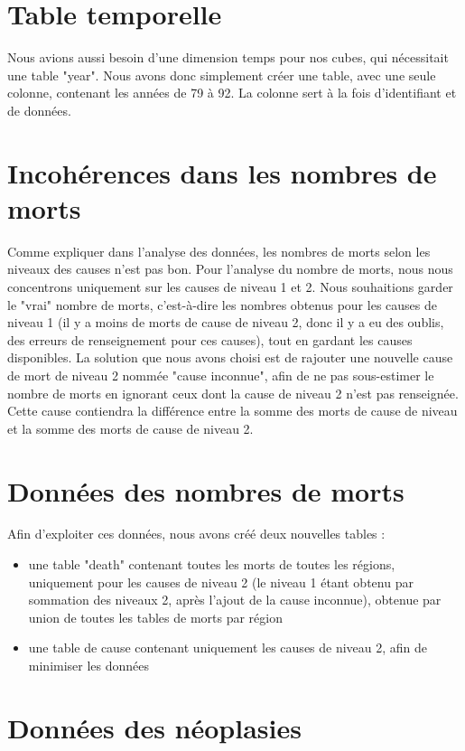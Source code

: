 \section{Table temporelle}

    Nous avions aussi besoin d'une dimension temps pour nos cubes, qui nécessitait une table "year". Nous avons donc simplement créer une table, avec une seule colonne, contenant les années de 79 à 92. La colonne sert à la fois d'identifiant et de données.


\section{Incohérences dans les nombres de morts}

    Comme expliquer dans l'analyse des données, les nombres de morts selon les niveaux des causes n'est pas bon. Pour l'analyse du nombre de morts, nous nous concentrons uniquement sur les causes de niveau 1 et 2. Nous souhaitions garder le "vrai" nombre de morts, c'est-à-dire les nombres obtenus pour les causes de niveau 1 (il y a moins de morts de cause de niveau 2, donc il y a eu des oublis, des erreurs de renseignement pour ces causes), tout en gardant les causes disponibles. La solution que nous avons choisi est de rajouter une nouvelle cause de mort de niveau 2 nommée "cause inconnue", afin de ne pas sous-estimer le nombre de morts en ignorant ceux dont la cause de niveau 2 n'est pas renseignée. Cette cause contiendra la différence entre la somme des morts de cause de niveau et la somme des morts de cause de niveau 2.

\section{Données des nombres de morts}

    Afin d'exploiter ces données, nous avons créé deux nouvelles tables :
    \begin{itemize}
        \item{une table "death" contenant toutes les morts de toutes les régions, uniquement pour les causes de niveau 2 (le niveau 1 étant obtenu par sommation des niveaux 2, après l'ajout de la cause inconnue), obtenue par union de toutes les tables de morts par région}
        \item{une table de cause contenant uniquement les causes de niveau 2, afin de minimiser les données}
    \end{itemize}

\section{Données des néoplasies}

